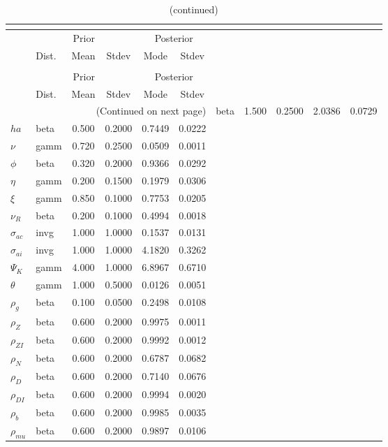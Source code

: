  
\begin{center}
\begin{longtable}{llcccc} 
\caption{Results from posterior maximization (parameters)}\\
 \label{Table:Posterior:1}\\
\toprule 
  & \multicolumn{3}{c}{Prior}  &  \multicolumn{2}{c}{Posterior} \\
  \cmidrule(r{.75em}){2-4} \cmidrule(r{.75em}){5-6}
  & Dist. & Mean  & Stdev & Mode & Stdev \\ 
\midrule \endfirsthead 
\caption{(continued)}\\
 \bottomrule 
  & \multicolumn{3}{c}{Prior}  &  \multicolumn{2}{c}{Posterior} \\
  \cmidrule(r{.75em}){2-4} \cmidrule(r{.75em}){5-6}
  & Dist. & Mean  & Stdev & Mode & Stdev \\ 
\midrule \endhead 
\bottomrule \multicolumn{6}{r}{(Continued on next page)}\endfoot 
\bottomrule\endlastfoot 
${\sigma}$ & beta &   1.500 & 0.2500 &   2.0386 &  0.0729 \\ 
${ha}$ & beta &   0.500 & 0.2000 &   0.7449 &  0.0222 \\ 
$\nu$ & gamm &   0.720 & 0.2500 &   0.0509 &  0.0011 \\ 
${\phi}$ & beta &   0.320 & 0.2000 &   0.9366 &  0.0292 \\ 
${\eta}$ & gamm &   0.200 & 0.1500 &   0.1979 &  0.0306 \\ 
$\xi$ & gamm &   0.850 & 0.1000 &   0.7753 &  0.0205 \\ 
${\nu_R}$ & beta &   0.200 & 0.1000 &   0.4994 &  0.0018 \\ 
${\sigma_{ac}}$ & invg &   1.000 & 1.0000 &   0.1537 &  0.0131 \\ 
${\sigma_{ai}}$ & invg &   1.000 & 1.0000 &   4.1820 &  0.3262 \\ 
${\Psi_{K}}$ & gamm &   4.000 & 1.0000 &   6.8967 &  0.6710 \\ 
${\theta}$ & gamm &   1.000 & 0.5000 &   0.0126 &  0.0051 \\ 
${\rho_g}$ & beta &   0.100 & 0.0500 &   0.2498 &  0.0108 \\ 
${\rho_Z}$ & beta &   0.600 & 0.2000 &   0.9975 &  0.0011 \\ 
${\rho_{ZI}}$ & beta &   0.600 & 0.2000 &   0.9992 &  0.0012 \\ 
${\rho_N}$ & beta &   0.600 & 0.2000 &   0.6787 &  0.0682 \\ 
${\rho_D}$ & beta &   0.600 & 0.2000 &   0.7140 &  0.0676 \\ 
${\rho_{DI}}$ & beta &   0.600 & 0.2000 &   0.9994 &  0.0020 \\ 
${\rho_b}$ & beta &   0.600 & 0.2000 &   0.9985 &  0.0035 \\ 
${\rho_{mu}}$ & beta &   0.600 & 0.2000 &   0.9897 &  0.0106 \\ 
\end{longtable}
 \end{center}
